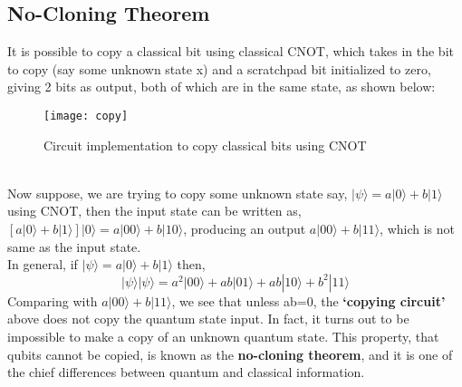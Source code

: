 \documentclass[12pt]{report}
\begin{document}
\subsection{No-Cloning Theorem}
It is possible to copy a classical bit using classical CNOT, which takes in the bit to copy (say some unknown state x) and a scratchpad bit initialized to zero, giving 2 bits as output, both of which are in the same state, as shown below: 
\begin{figure}[h]
\centering
\texttt{[image: copy]}
\caption{Circuit implementation to copy classical bits using CNOT}
\label{fig:copy}
\end{figure}
\\
Now suppose, we are trying to copy some unknown state say, $|\psi\rangle = a|0\rangle + b|1\rangle$ using CNOT, then the input state can be written as, $[a|0\rangle + b|1\rangle]|0\rangle = a|00\rangle + b|10\rangle$, producing an output $a|00\rangle + b|11\rangle$, which is not same as the input state.\\
In general, if $|\psi\rangle = a|0\rangle + b|1\rangle$ then, 
\begin{equation}
|\psi\rangle |\psi\rangle = a^2|00\rangle + ab|01\rangle + ab|10\rangle  + b^2|11\rangle
\end{equation}
Comparing with $a|00\rangle + b|11\rangle$, we see that unless ab=0, the \textbf{‘copying circuit’} above does not copy the quantum state input. In fact, it turns out to be impossible to make a copy of an unknown quantum state. This property, that qubits cannot be copied, is known as the \textbf{no-cloning theorem}, and it is one of the chief differences between quantum and classical information.
\end{document}
